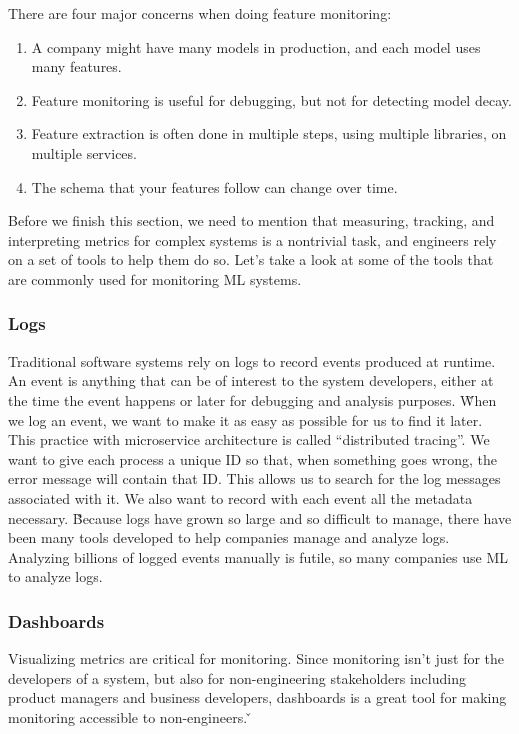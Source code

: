 There are four major concerns when doing feature monitoring:
\begin{enumerate}
\item A company might have many models in production, and each model uses many features.
\item Feature monitoring is useful for debugging, but not for detecting model decay.
\item Feature extraction is often done in multiple steps, using multiple libraries, on multiple services.
\item The schema that your features follow can change over time.
\end{enumerate}

Before we finish this section, we need to mention that measuring, tracking, and interpreting metrics for complex
systems is a nontrivial task, and engineers rely on a set of tools to help them do so. Let's take a look at some of
the tools that are commonly used for monitoring ML systems.

\subsubsection*{Logs}

Traditional software systems rely on logs to record events produced at runtime. An event is anything that can be of
interest to the system developers, either at the time the event happens or later for debugging and analysis purposes.
\v

When we log an event, we want to make it as easy as possible for us to find it later. This practice with microservice
architecture is called ``distributed tracing''. We want to give each process a unique ID so that, when something goes
wrong, the error message will contain that ID. This allows us to search for the log messages associated with it. We
also want to record with each event all the metadata necessary. \v

Because logs have grown so large and so difficult to manage, there have been many tools developed to help companies
manage and analyze logs. Analyzing billions of logged events manually is futile, so many companies use ML to analyze
logs.

\subsubsection*{Dashboards}

Visualizing metrics are critical for monitoring. Since monitoring isn't just for the developers of a system, but also
for non-engineering stakeholders including product managers and business developers, dashboards is a great tool for
making monitoring accessible to non-engineers. \v

